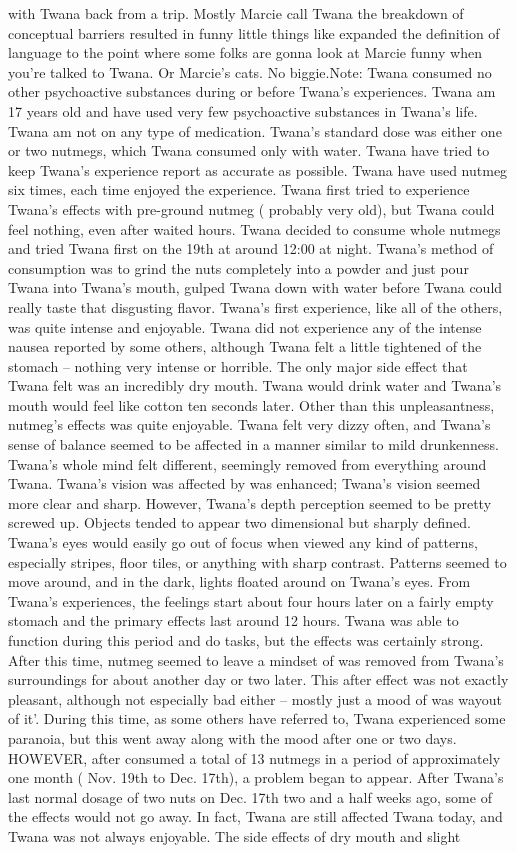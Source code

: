 \documentclass[12pt]{book}
\begin{document}
with Twana back from a trip. Mostly Marcie call Twana the breakdown of conceptual barriers resulted in funny little things like expanded the definition of language to the point where some folks are gonna look at Marcie funny when you're talked to Twana. Or Marcie's cats. No biggie.Note: Twana consumed no other psychoactive substances during or before Twana's experiences. Twana am 17 years old and have used very few psychoactive substances in Twana's life. Twana am not on any type of medication. Twana's standard dose was either one or two nutmegs, which Twana consumed only with water. Twana have tried to keep Twana's experience report as accurate as possible. Twana have used nutmeg six times, each time enjoyed the experience. Twana first tried to experience Twana's effects with pre-ground nutmeg ( probably very old), but Twana could feel nothing, even after waited hours. Twana decided to consume whole nutmegs and tried Twana first on the 19th at around 12:00 at night. Twana's method of consumption was to grind the nuts completely into a powder and just pour Twana into Twana's mouth, gulped Twana down with water before Twana could really taste that disgusting flavor. Twana's first experience, like all of the others, was quite intense and enjoyable. Twana did not experience any of the intense nausea reported by some others, although Twana felt a little tightened of the stomach -- nothing very intense or horrible. The only major side effect that Twana felt was an incredibly dry mouth. Twana would drink water and Twana's mouth would feel like cotton ten seconds later. Other than this unpleasantness, nutmeg's effects was quite enjoyable. Twana felt very dizzy often, and Twana's sense of balance seemed to be affected in a manner similar to mild drunkenness. Twana's whole mind felt different, seemingly removed from everything around Twana. Twana's vision was affected by was enhanced; Twana's vision seemed more clear and sharp. However, Twana's depth perception seemed to be pretty screwed up. Objects tended to appear two dimensional but sharply defined. Twana's eyes would easily go out of focus when viewed any kind of patterns, especially stripes, floor tiles, or anything with sharp contrast. Patterns seemed to move around, and in the dark, lights floated around on Twana's eyes. From Twana's experiences, the feelings start about four hours later on a fairly empty stomach and the primary effects last around 12 hours. Twana was able to function during this period and do tasks, but the effects was certainly strong. After this time, nutmeg seemed to leave a mindset of was removed from Twana's surroundings for about another day or two later. This after effect was not exactly pleasant, although not especially bad either -- mostly just a mood of was wayout of it'. During this time, as some others have referred to, Twana experienced some paranoia, but this went away along with the mood after one or two days. HOWEVER, after consumed a total of 13 nutmegs in a period of approximately one month ( Nov. 19th to Dec. 17th), a problem began to appear. After Twana's last normal dosage of two nuts on Dec. 17th two and a half weeks ago, some of the effects would not go away. In fact, Twana are still affected Twana today, and Twana was not always enjoyable. The side effects of dry mouth and slight 
\end{document}
